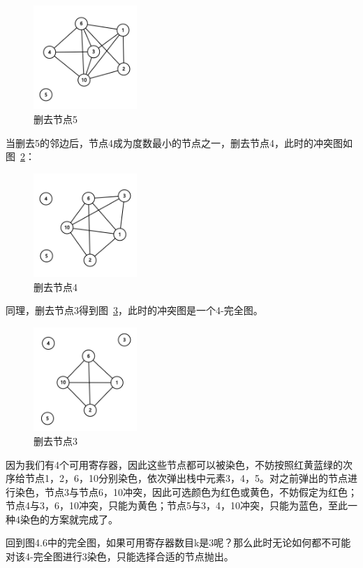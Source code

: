 \begin{figure}[htb]
  \centering
  \includegraphics[width=0.35\textwidth]{figures/graph1.png}
  \caption{删去节点5}
  \label{fig:graph1}
\end{figure}

当删去5的邻边后，节点4成为度数最小的节点之一，删去节点4，此时的冲突图如图~\ref{fig:graph2}：

\begin{figure}[htb]
  \centering
  \includegraphics[width=0.35\textwidth]{figures/graph2.png}
  \caption{删去节点4}
  \label{fig:graph2}
\end{figure}

同理，删去节点3得到图~\ref{fig:graph3}，此时的冲突图是一个4-完全图。

\begin{figure}[htb]
  \centering
  \includegraphics[width=0.35\textwidth]{figures/graph3.png}
  \caption{删去节点3}
  \label{fig:graph3}
\end{figure}

因为我们有4个可用寄存器，因此这些节点都可以被染色，不妨按照红黄蓝绿的次序给节点1，2，6，10分别染色，依次弹出栈中元素3，4，5。对之前弹出的节点进行染色，节点3与节点6，10冲突，因此可选颜色为红色或黄色，不妨假定为红色；节点4与3，6，10冲突，只能为黄色；节点5与3，4，10冲突，只能为蓝色，至此一种4染色的方案就完成了。

回到图4.6中的完全图，如果可用寄存器数目k是3呢？那么此时无论如何都不可能对该4-完全图进行3染色，只能选择合适的节点抛出。